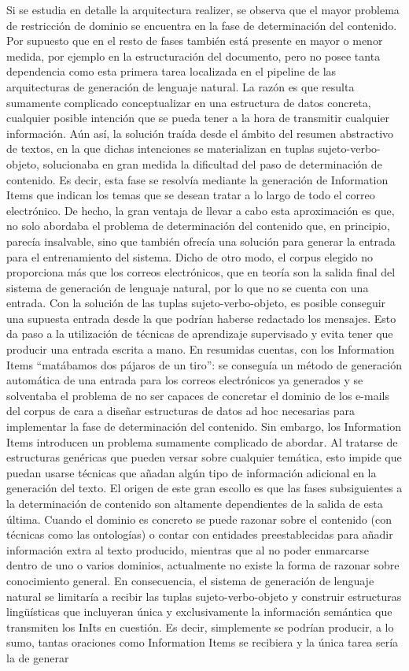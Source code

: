 Si se estudia en detalle la arquitectura realizer, se observa que el mayor problema de restricción de dominio se encuentra en la fase de determinación del contenido. Por supuesto que en el resto de fases también está presente en mayor o menor medida, por ejemplo en la estructuración del documento, pero no posee tanta dependencia como esta primera tarea localizada en el pipeline de las arquitecturas de generación de lenguaje natural. La razón es que resulta sumamente complicado conceptualizar en una estructura de datos concreta, cualquier posible intención que se pueda tener a la hora de transmitir cualquier información. Aún así, la solución traída desde el ámbito del resumen abstractivo de textos, en la que dichas intenciones se materializan en tuplas sujeto-verbo-objeto, solucionaba en gran medida la dificultad del paso de determinación de contenido. Es decir, esta fase se resolvía mediante la generación de Information Items que indican los temas que se desean tratar a lo largo de todo el correo electrónico. De hecho, la gran ventaja de llevar a cabo esta aproximación es que, no solo abordaba el problema de determinación del contenido que, en principio, parecía insalvable, sino que también ofrecía una solución para generar la entrada para el entrenamiento del sistema. Dicho de otro modo, el corpus elegido no proporciona más que los correos electrónicos, que en teoría son la salida final del sistema de generación de lenguaje natural, por lo que no se cuenta con una entrada. Con la solución de las tuplas sujeto-verbo-objeto, es posible conseguir una supuesta entrada desde la que podrían haberse redactado los mensajes. Esto da paso a la utilización de técnicas de aprendizaje supervisado y evita tener que producir una entrada escrita a mano. En resumidas cuentas, con los Information Items ``matábamos dos pájaros de un tiro'': se conseguía un método de generación automática de una entrada para los correos electrónicos ya generados y se solventaba el problema de no ser capaces de concretar el dominio de los e-mails del corpus de cara a diseñar estructuras de datos ad hoc necesarias para implementar la fase de determinación del contenido. Sin embargo, los Information Items introducen un problema sumamente complicado de abordar. Al tratarse de estructuras genéricas que pueden versar sobre cualquier temática, esto impide que puedan usarse técnicas que añadan algún tipo de información adicional en la generación del texto. El origen de este gran escollo es que las fases subsiguientes a la determinación de contenido son altamente dependientes de la salida de esta última. Cuando el dominio es concreto se puede razonar sobre el contenido (con técnicas como las ontologías) o contar con entidades preestablecidas para añadir información extra al texto producido, mientras que al no poder enmarcarse dentro de uno o varios dominios, actualmente no existe la forma de razonar sobre conocimiento general. En consecuencia, el sistema de generación de lenguaje natural se limitaría a recibir las tuplas sujeto-verbo-objeto y construir estructuras lingüísticas que incluyeran única y exclusivamente la información semántica que transmiten los InIts en cuestión. Es decir, simplemente se podrían producir, a lo sumo, tantas oraciones como Information Items se recibiera y la única tarea sería la de generar 